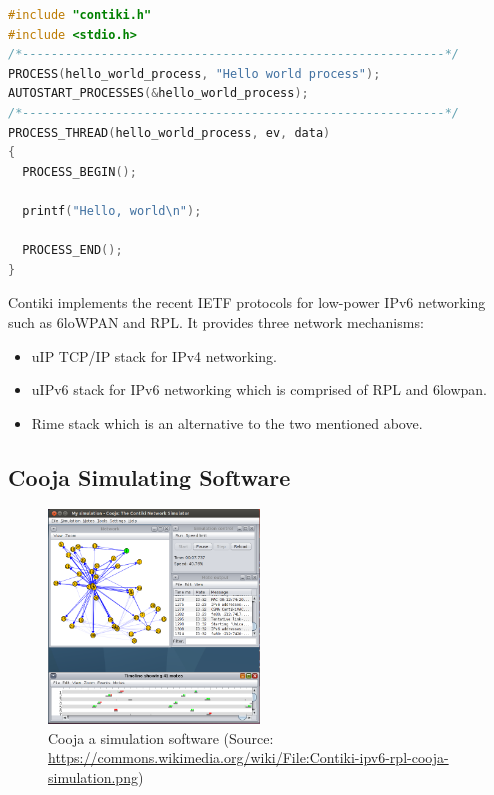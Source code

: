 \begin{lstlisting}[language=C, frame=single, caption={Hello world program}, label=contiki_prog]
#include "contiki.h"
#include <stdio.h>
/*-----------------------------------------------------------*/
PROCESS(hello_world_process, "Hello world process");
AUTOSTART_PROCESSES(&hello_world_process);
/*-----------------------------------------------------------*/
PROCESS_THREAD(hello_world_process, ev, data)
{
  PROCESS_BEGIN();

  printf("Hello, world\n");

  PROCESS_END();
}
\end{lstlisting}

Contiki implements the recent IETF protocols for low-power IPv6 networking such as 6loWPAN and RPL. It provides three network mechanisms:
\begin{itemize}
\item uIP TCP/IP stack for IPv4 networking.
\item uIPv6 stack for IPv6 networking which is comprised of RPL and 6lowpan.
\item Rime stack which is an alternative to the two mentioned above.
\end{itemize}


\subsection*{Cooja Simulating Software}

\begin{figure}
  \centering
  \includegraphics[width=0.5\textwidth]{res/cooja.png}
  \caption{Cooja a simulation software (Source: \url{https://commons.wikimedia.org/wiki/File:Contiki-ipv6-rpl-cooja-simulation.png})}
  \label{fig:cooja}
\end{figure}


